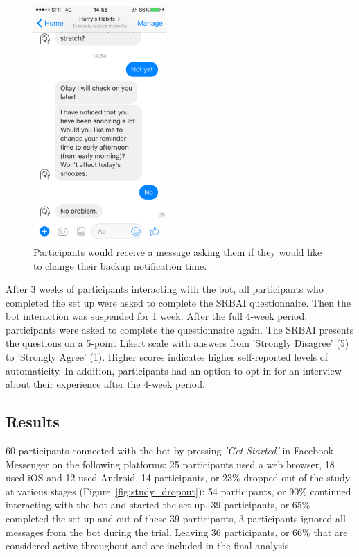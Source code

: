 \begin{figure}[H]
  \centering
  \includegraphics[width=2in]{resources/design/media/4.png}
  \caption{Participants would receive a message asking them if they would like to change their backup notification time.}
  \label{fig:snoozing_too_much}
\end{figure}

After 3 weeks of participants interacting with the bot, all participants who completed the set up were asked to complete the SRBAI questionnaire. Then the bot interaction was suspended for 1 week. After the full 4-week period, participants were asked to complete the questionnaire again. The SRBAI presents the questions on a 5-point Likert scale with answers from 'Strongly Disagree' (5) to 'Strongly Agree' (1). Higher scores indicates higher self-reported levels of automaticity. In addition, participants had an option to opt-in for an interview about their experience after the 4-week period.

\subsection{Results}
60 participants connected with the bot by pressing \textit{'Get Started'} in Facebook Messenger on the following platforms: 25 participants used a web browser, 18 used iOS and 12 used Android. 14 participants, or 23\% dropped out of the study at various stages (Figure~\ref{fig:study_dropout}): 54 participants, or 90\% continued interacting with the bot and started the set-up. 39 participants, or 65\% completed the set-up and out of these 39 participants, 3 participants ignored all messages from the bot during the trial. Leaving 36 participants, or 66\% that are considered active throughout and are included in the final analysis.


